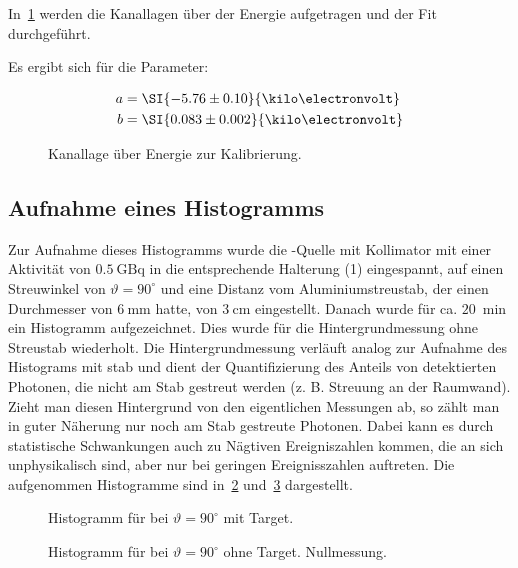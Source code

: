 \documentclass[slug=CS, room=Andreas-Schubert-Bau\,\ Labor\ 406,
supervisor=Juliane\ Volkmer, coursedate=29.\ 11.\ 2019]{../../Lab_Report_LaTeX/lab_report}
\newcommand{\am}{\ce{^241Am} }
\begin{document}
In~\ref{fig:energyfit} werden die Kanallagen \"uber der Energie
aufgetragen und der Fit durchgef\"uhrt.

Es ergibt sich f\"ur die Parameter:

\begin{align}
  a &= \SI{-5.76\pm 0.10}{\kilo\electronvolt} \\
  b &= \SI{0.083\pm 0.002}{\kilo\electronvolt} \\
\end{align}


\begin{figure}[h]\centering
  
  \caption{Kanallage \"uber Energie zur Kalibrierung.}
  \label{fig:energyfit}
\end{figure}

\subsection{Aufnahme eines Histogramms}
\label{sec:histogramm}

Zur Aufnahme dieses Histogramms wurde die \am{}-Quelle mit Kollimator
mit einer Aktivität von \(\SI{0,5}{\giga\becquerel}\) in die
entsprechende Halterung (1) eingespannt, auf einen Streuwinkel von
\(\vartheta = 90^\circ\) und eine Distanz vom Aluminiumstreustab, der
einen Durchmesser von \(\SI{6}{\milli\metre}\) hatte, von
\(\SI{3}{\centi\metre}\) eingestellt.  Danach wurde für
ca. \(\SI{20}{\min}\) ein Histogramm aufgezeichnet. Dies wurde für die
Hintergrundmessung ohne Streustab wiederholt. Die Hintergrundmessung
verl\"auft analog zur Aufnahme des Histograms mit stab und dient der
Quantifizierung des Anteils von detektierten Photonen, die nicht am
Stab gestreut werden (z. B. Streuung an der Raumwand). Zieht man
diesen Hintergrund von den eigentlichen Messungen ab, so z\"ahlt man
in guter N\"aherung nur noch am Stab gestreute Photonen. Dabei kann es
durch statistische Schwankungen auch zu N\"agtiven Ereigniszahlen
kommen, die an sich unphysikalisch sind, aber nur bei geringen
Ereignisszahlen auftreten.  Die aufgenommen Histogramme sind
in~\ref{fig:am20hist} und~\ref{fig:am20histnull} dargestellt.

\begin{figure}[h]\centering
  
  \caption{Histogramm f\"ur \am{} bei \(\vartheta = 90^\circ\) mit Target.}
  \label{fig:am20hist}
\end{figure}
\begin{figure}[h]\centering
  
  \caption{Histogramm f\"ur \am{} bei \(\vartheta = 90^\circ\) ohne
    Target. Nullmessung.}
  \label{fig:am20histnull}
\end{figure}
\end{document}
